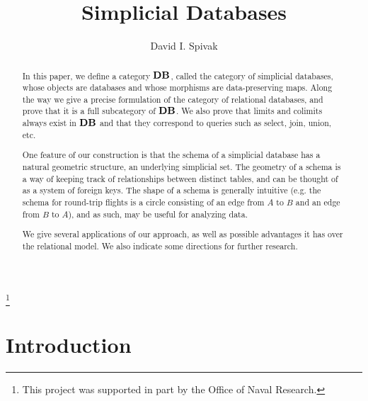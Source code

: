 \documentclass{amsart}
\begin{document}
\author{David I. Spivak}

\thanks{This project was supported in part by the Office of Naval Research.}

\title{Simplicial Databases}

\begin{abstract}

In this paper, we define a category ${\bf DB}$, called the category of simplicial databases, whose objects are databases and whose morphisms are data-preserving maps.  Along the way we give a precise formulation of the category of relational databases, and prove that it is a full subcategory of ${\bf DB}$.  We also prove that limits and colimits always exist in ${\bf DB}$ and that they correspond to queries such as select, join, union, etc.

One feature of our construction is that the schema of a simplicial database has a natural geometric structure, an underlying simplicial set.  The geometry of a schema is a way of keeping track of relationships between distinct tables, and can be thought of as a system of foreign keys.  The shape of a schema is generally intuitive (e.g. the schema for round-trip flights is a circle consisting of an edge from $A$ to $B$ and an edge from $B$ to $A$), and as such, may be useful for analyzing data.  

We give several applications of our approach, as well as possible advantages it has over the relational model.  We also indicate some directions for further research.

\end{abstract}

\maketitle

\setcounter{tocdepth}{1}

\tableofcontents




\section{Introduction}\label{sec:intro}
\end{document}

